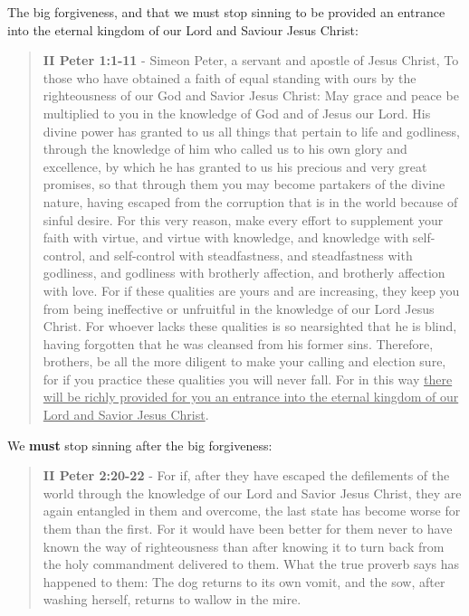 \documentclass[11pt]{article}
\begin{document}
The big forgiveness, and that we must stop sinning to be provided an entrance into the eternal kingdom of our Lord and Saviour Jesus Christ:

\begin{quote}
\textbf{II Peter 1:1-11} - Simeon Peter, a servant and apostle of Jesus Christ, To those who have obtained a faith of equal standing with ours by the righteousness of our God and Savior Jesus Christ: May grace and peace be multiplied to you in the knowledge of God and of Jesus our Lord.  His divine power has granted to us all things that pertain to life and godliness, through the knowledge of him who called us to his own glory and excellence, by which he has granted to us his precious and very great promises, so that through them you may become partakers of the divine nature, having escaped from the corruption that is in the world because of sinful desire.  For this very reason, make every effort to supplement your faith with virtue, and virtue with knowledge, and knowledge with self-control, and self-control with steadfastness, and steadfastness with godliness, and godliness with brotherly affection, and brotherly affection with love.  For if these qualities are yours and are increasing, they keep you from being ineffective or unfruitful in the knowledge of our Lord Jesus Christ.  For whoever lacks these qualities is so nearsighted that he is blind, having forgotten that he was cleansed from his former sins.  Therefore, brothers, be all the more diligent to make your calling and election sure, for if you practice these qualities you will never fall.  For in this way \uline{there will be richly provided for you an entrance into the eternal kingdom of our Lord and Savior Jesus Christ}.
\end{quote}

We \textbf{must} stop sinning after the big forgiveness:

\begin{quote}
\textbf{II Peter 2:20-22} - For if, after they have escaped the defilements of the world through the knowledge of our Lord and Savior Jesus Christ, they are again entangled in them and overcome, the last state has become worse for them than the first. For it would have been better for them never to have known the way of righteousness than after knowing it to turn back from the holy commandment delivered to them. What the true proverb says has happened to them: The dog returns to its own vomit, and the sow, after washing herself, returns to wallow in the mire.
\end{quote}
\end{document}
